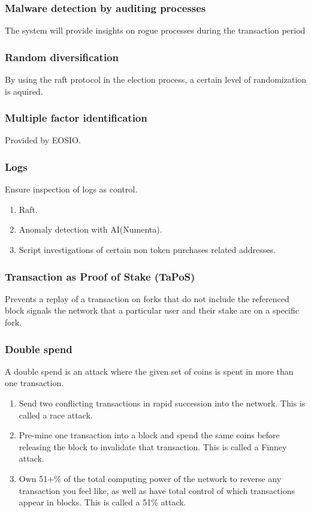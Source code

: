 \documentclass[]{article}
\begin{document}
		\subsubsection{Malware detection by auditing processes}
		The system will provide insights on rogue processes during the transaction period 
		\subsubsection{Random diversification}
		By using the raft protocol in the election process, a certain level of randomization is aquired.
		\subsubsection{Multiple factor identification}
		Provided by EOSIO.
		\subsubsection {Logs}
			Ensure inspection of logs as control.
			\begin{enumerate}
				\item Raft.
				\item Anomaly detection with AI(Numenta).
				\item Script investigations of certain non token purchases related addresses.
			\end{enumerate}
		\subsubsection{Transaction as Proof of Stake (TaPoS)}
			Prevents a replay of a transaction on forks that do not include the referenced block signals the network that a particular user and their stake are on a specific fork.
		\subsubsection{Double spend}
		A double spend is an attack where the given set of coins is spent in more than one transaction.
		\begin{enumerate}
			\item Send two conflicting transactions in rapid succession into the network. This is called a race attack.
			\item Pre-mine one transaction into a block and spend the same coins before releasing the block to invalidate that transaction. This is called a Finney attack.
			\item Own 51+\% of the total computing power of the network to reverse any transaction you feel like, as well as have total control of which transactions appear in blocks. This is called a 51\% attack. 
		\end{enumerate} 
\end{document}
